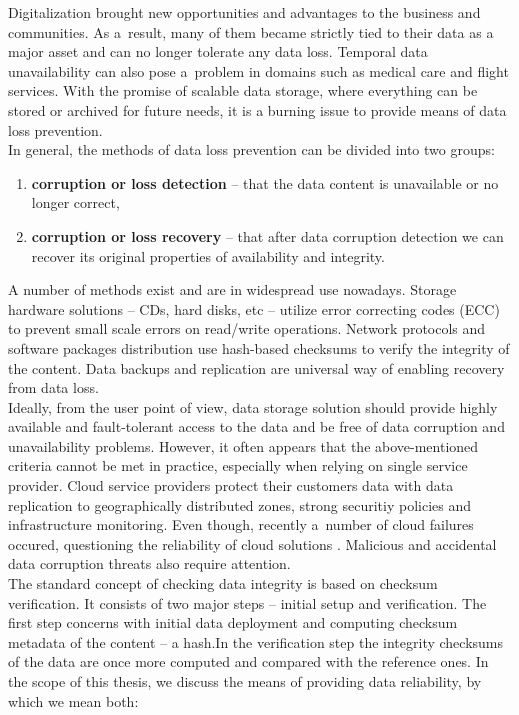 Digitalization brought new opportunities and advantages to the business and communities.
As a~result, many of them became strictly tied to their data as a major asset and
can no longer tolerate any data loss. Temporal data unavailability can also pose 
a~problem in domains such as medical care and flight services. With the promise
of scalable data storage, where everything can be stored or archived for future
needs, it is a burning issue to provide means of data loss prevention.\\

In general, the methods of data loss prevention can be divided into two groups:

\begin{enumerate}
\item \textbf{corruption or loss detection} -- that the data content is unavailable
or no longer correct,
\item \textbf{corruption or loss recovery} -- that after data corruption detection
we can recover its original properties of availability and integrity.
\end{enumerate}

A number of methods exist and are in widespread use nowadays. Storage hardware
solutions -- CDs, hard disks, etc -- utilize error correcting codes (ECC) to prevent
small scale errors on read/write operations. Network protocols and software packages
distribution use hash-based checksums to verify the integrity of the content. Data
backups and replication are universal way of enabling recovery from data loss.\\

Ideally, from the user point of view, data storage solution should provide highly
available and fault-tolerant access to the data and be free of data corruption and
unavailability problems. However, it often appears that the above-mentioned
criteria cannot be met in practice,
especially when relying on single service provider. Cloud service providers protect
their customers data with data replication to geographically distributed zones,
strong securitiy policies and infrastructure monitoring. Even though, recently
a~number of cloud failures occured, questioning the reliability of
cloud solutions \cite{cloud-downtime-stats} . Malicious and accidental data corruption threats also require
attention.\\ 

The standard concept of checking data integrity is based on checksum verification.
It consists of two major steps -- initial setup and verification. The first step
concerns with initial data deployment and computing checksum metadata of the content
-- a hash.In the verification step the integrity checksums of the data are once more
computed and compared with the reference ones. In the scope of this thesis, we discuss
the means of providing data reliability, by which we mean both:


